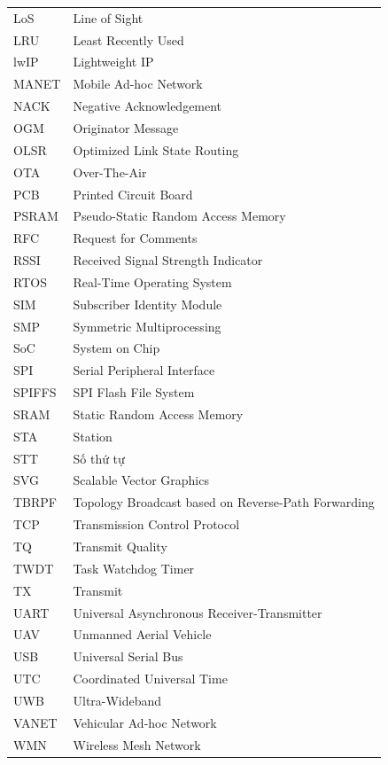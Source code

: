 \begin{longtable}{@{}p{3.2cm}p{11.8cm}@{}}
LoS & Line of Sight \\
LRU & Least Recently Used \\
lwIP & Lightweight IP \\
MANET & Mobile Ad-hoc Network \\
NACK & Negative Acknowledgement \\
OGM & Originator Message \\
OLSR & Optimized Link State Routing \\
OTA & Over-The-Air \\
PCB & Printed Circuit Board \\
PSRAM & Pseudo-Static Random Access Memory \\
RFC & Request for Comments \\
RSSI & Received Signal Strength Indicator \\
RTOS & Real-Time Operating System \\
SIM & Subscriber Identity Module \\
SMP & Symmetric Multiprocessing \\
SoC & System on Chip \\
SPI & Serial Peripheral Interface \\
SPIFFS & SPI Flash File System \\
SRAM & Static Random Access Memory \\
STA & Station \\
STT & Số thứ tự \\
SVG & Scalable Vector Graphics \\
TBRPF & Topology Broadcast based on Reverse-Path Forwarding \\
TCP & Transmission Control Protocol \\
TQ & Transmit Quality \\
TWDT & Task Watchdog Timer \\
TX & Transmit \\
UART & Universal Asynchronous Receiver-Transmitter \\
UAV & Unmanned Aerial Vehicle \\
USB & Universal Serial Bus \\
UTC & Coordinated Universal Time \\
UWB & Ultra-Wideband \\
VANET & Vehicular Ad-hoc Network \\
WMN & Wireless Mesh Network \\
\end{longtable}
